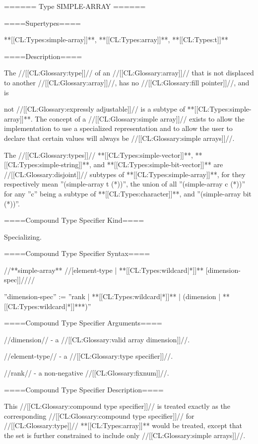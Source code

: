 ====== Type SIMPLE-ARRAY ======

====Supertypes====

**[[CL:Types:simple-array]]**, **[[CL:Types:array]]**, **[[CL:Types:t]]**

====Description====

The //[[CL:Glossary:type]]// of an //[[CL:Glossary:array]]// that is not displaced to another //[[CL:Glossary:array]]//, has no //[[CL:Glossary:fill pointer]]//, and is

not //[[CL:Glossary:expressly adjustable]]// is a subtype of **[[CL:Types:simple-array]]**. The concept of a //[[CL:Glossary:simple array]]// exists to allow the implementation to use a specialized representation and to allow the user to declare that certain values will always be //[[CL:Glossary:simple arrays]]//.

The //[[CL:Glossary:types]]// **[[CL:Types:simple-vector]]**, **[[CL:Types:simple-string]]**, and **[[CL:Types:simple-bit-vector]]** are //[[CL:Glossary:disjoint]]// subtypes of **[[CL:Types:simple-array]]**, for they respectively mean ''(simple-array t (*))'', the union of all ''(simple-array c (*))'' for any ''c'' being a subtype of **[[CL:Types:character]]**, and ''(simple-array bit (*))''.

====Compound Type Specifier Kind====

Specializing.

====Compound Type Specifier Syntax====

//**simple-array** //[{element-type | **[[CL:Types:wildcard|*]]**} [dimension-spec]]////

''dimension-spec'' := ''rank | **[[CL:Types:wildcard|*]]** | ({dimension | **[[CL:Types:wildcard|*]]**}*)''

====Compound Type Specifier Arguments====

//dimension// - a //[[CL:Glossary:valid array dimension]]//.

//element-type// - a //[[CL:Glossary:type specifier]]//.

//rank// - a non-negative //[[CL:Glossary:fixnum]]//.

====Compound Type Specifier Description====

This //[[CL:Glossary:compound type specifier]]// is treated exactly as the corresponding //[[CL:Glossary:compound type specifier]]// for //[[CL:Glossary:type]]// **[[CL:Types:array]]** would be treated, except that the set is further constrained to include only //[[CL:Glossary:simple arrays]]//.

